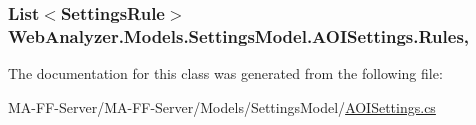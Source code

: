 \subsubsection[{Rules}]{\setlength{\rightskip}{0pt plus 5cm}List$<${\bf Settings\+Rule}$>$ Web\+Analyzer.\+Models.\+Settings\+Model.\+A\+O\+I\+Settings.\+Rules\hspace{0.3cm}{\ttfamily [get]}, {\ttfamily [set]}}\label{class_web_analyzer_1_1_models_1_1_settings_model_1_1_a_o_i_settings_a8852191a79accfc1288d0fb6a2b4a14c}


The documentation for this class was generated from the following file\+:\begin{DoxyCompactItemize}
\item 
M\+A-\/\+F\+F-\/\+Server/\+M\+A-\/\+F\+F-\/\+Server/\+Models/\+Settings\+Model/\hyperlink{_a_o_i_settings_8cs}{A\+O\+I\+Settings.\+cs}\end{DoxyCompactItemize}
